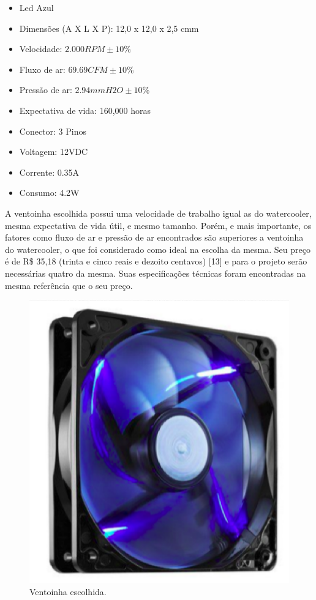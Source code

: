 \begin{itemize}
\item Led Azul
\item Dimensões (A X L X P): 12,0 x 12,0 x 2,5 cmm
\item Velocidade: $2.000 RPM \pm 10$\%
\item Fluxo de ar: $69.69 CFM \pm 10$\%
\item Pressão de ar: $2.94 mmH2O \pm 10$\%
\item Expectativa de vida: 160,000 horas
\item Conector: 3 Pinos
\item Voltagem: 12VDC
\item Corrente: 0.35A
\item Consumo: 4.2W
\end{itemize}

A ventoinha escolhida possui uma velocidade de trabalho igual as do watercooler, mesma expectativa de vida útil, e mesmo tamanho. Porém, e mais importante, os fatores como fluxo de ar e pressão de ar encontrados são superiores a ventoinha do watercooler, o que foi considerado como ideal na escolha da mesma. Seu preço é de R\$ 35,18 (trinta e cinco reais e dezoito centavos) [13] e para o projeto serão necessárias quatro da mesma. Suas especificações técnicas foram encontradas na mesma referência que o seu preço.

\begin{figure}[!htb]                                                               
   \centering                                                                      
   \includegraphics[scale=0.4, keepaspectratio=true]{figuras/ventoinha.eps}
   \caption{Ventoinha escolhida.}               
\end{figure}


